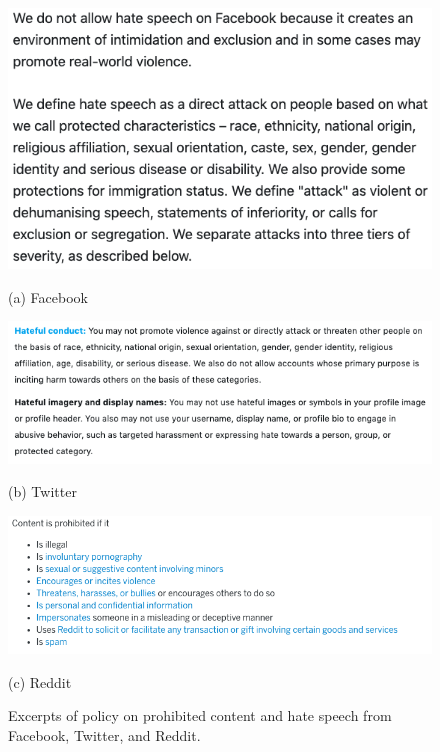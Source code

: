 \begin{figure}[!htb]
  \begin{minipage}{0.32\textwidth}
    \includegraphics[width=\linewidth]{Chapter2/Figs/Facebook.png}
    \caption*{(a) Facebook}
  \end{minipage}\hfill
  \begin{minipage}{0.32\textwidth}
    \includegraphics[width=\linewidth]{Chapter2/Figs/Twitter.png}
    \caption*{(b) Twitter}
  \end{minipage}\hfill
  \begin{minipage}{0.32\textwidth}
    \includegraphics[width=\linewidth]{Chapter2/Figs/Reddit.png}
    \caption*{(c) Reddit}
  \end{minipage}\hfill
  \caption{Excerpts of policy on prohibited content and hate speech from Facebook, Twitter, and Reddit.}
  \label{fig:policies}
\end{figure}

